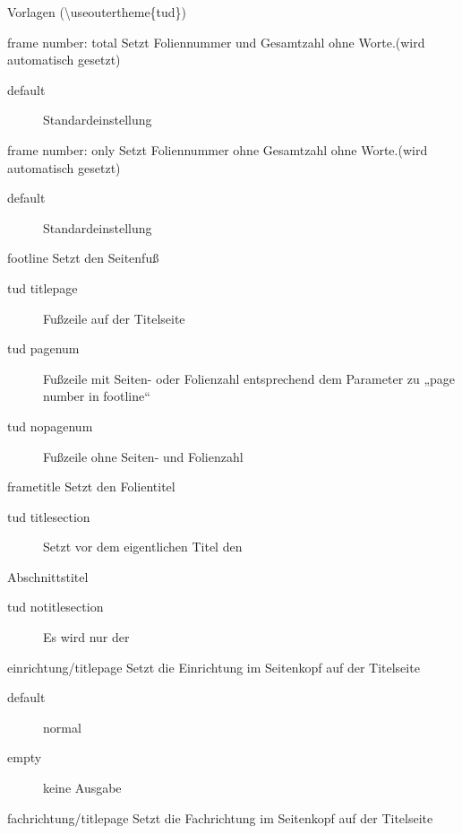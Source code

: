 \documentclass[presentation,t]{beamer}
\begin{document}
\begin{frame}[allowframebreaks]{Vorlagen (\textbackslash useoutertheme\{tud\})}
\begin{block}{frame number: total}
Setzt Foliennummer und Gesamtzahl ohne Worte.(wird automatisch gesetzt)
\begin{description}
\item[{default}] Standardeinstellung
\end{description}
\end{block}

\begin{block}{frame number: only}
Setzt Foliennummer ohne  Gesamtzahl ohne Worte.(wird automatisch gesetzt)
\begin{description}
\item[{default}] Standardeinstellung
\end{description}
\end{block}


\begin{block}{footline}
Setzt den Seitenfuß

\begin{description}
\item[{tud titlepage}] Fußzeile auf der Titelseite
\item[{tud pagenum}] Fußzeile mit Seiten- oder Folienzahl entsprechend dem
Parameter zu „page number in footline“
\item[{tud nopagenum}] Fußzeile ohne Seiten- und Folienzahl
\end{description}
\end{block}

\begin{block}{frametitle}
Setzt den Folientitel
\begin{description}
\item[{tud titlesection}] Setzt vor dem eigentlichen Titel den
\end{description}
Abschnittstitel
\begin{description}
\item[{tud notitlesection}] Es wird nur der
\end{description}
\end{block}

\begin{block}{einrichtung/titlepage}
Setzt die Einrichtung im Seitenkopf auf der Titelseite

\begin{description}
\item[{default}] normal
\item[{empty}] keine Ausgabe
\end{description}
\end{block}
\begin{block}{fachrichtung/titlepage}
Setzt die Fachrichtung im Seitenkopf auf der Titelseite


\end{block}
\end{frame}
\end{document}
